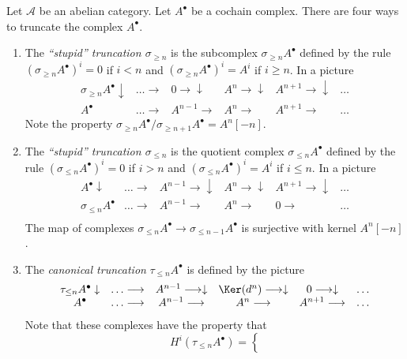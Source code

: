 Let $\mathcal{A}$ be an abelian category.
Let $A^\bullet$ be a cochain complex. There
are four ways to truncate the complex $A^\bullet$.
\begin{enumerate}
\item The {\it ``stupid'' truncation $\sigma_{\geq n}$} is the subcomplex
$\sigma_{\geq n} A^\bullet$ defined by the rule
$(\sigma_{\geq n} A^\bullet)^i = 0$ if
$i < n$ and $(\sigma_{\geq n} A^\bullet)^i = A^i$ if
$i \geq n$. In a picture
$$
\begin{array}{cccccc}\sigma_{\geq n}A^\bullet \downarrow & \ldots \longrightarrow & 0 \longrightarrow\downarrow & A^n \longrightarrow\downarrow & A^{n + 1} \longrightarrow\downarrow & \ldots \\ A^\bullet & \ldots \longrightarrow & A^{n - 1} \longrightarrow & A^n \longrightarrow & A^{n + 1} \longrightarrow & \ldots\end{array}
$$
Note the property
$\sigma_{\geq n}A^\bullet / \sigma_{\geq n + 1}A^\bullet
= A^n[-n]$.
\item The {\it ``stupid'' truncation $\sigma_{\leq n}$}
is the quotient complex $\sigma_{\leq n} A^\bullet$ defined
by the rule $(\sigma_{\leq n} A^\bullet)^i = 0$ if
$i > n$ and $(\sigma_{\leq n} A^\bullet)^i = A^i$ if
$i \leq n$. In a picture
$$
\begin{array}{cccccc}A^\bullet \downarrow & \ldots \longrightarrow & A^{n - 1} \longrightarrow\downarrow & A^n \longrightarrow\downarrow & A^{n + 1} \longrightarrow\downarrow & \ldots \\ \sigma_{\leq n}A^\bullet & \ldots \longrightarrow & A^{n - 1} \longrightarrow & A^n \longrightarrow & 0 \longrightarrow & \ldots \\  &  &  &  &  & \end{array}
$$
The map of complexes
$\sigma_{\leq n}A^\bullet \to \sigma_{\leq n - 1}A^\bullet$ is surjective
with kernel $A^n[-n]$.
\item The {\it canonical truncation} $\tau_{\leq n}A^\bullet$
is defined by the picture
$$
\begin{array}{cccccc}\tau_{\leq n}A^\bullet \downarrow & \ldots \longrightarrow & A^{n - 1} \longrightarrow\downarrow & \Ker(d^n) \longrightarrow\downarrow & 0 \longrightarrow\downarrow & \ldots \\ A^\bullet & \ldots \longrightarrow & A^{n - 1} \longrightarrow & A^n \longrightarrow & A^{n + 1} \longrightarrow & \ldots\end{array}
$$
Note that these complexes have the property that
$$
H^i(\tau_{\leq n}A^\bullet) =
\left\{
$$
\end{enumerate}
